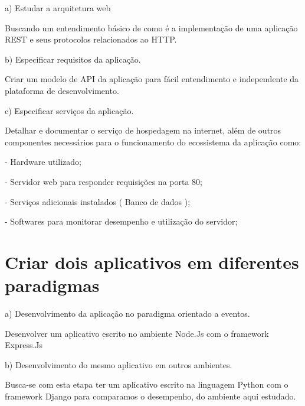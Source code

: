   \begin{compactitem}
    \item[a)] Estudar a arquitetura web
    
    Buscando um entendimento básico de como é a implementação de uma aplicação 
    \ac{REST} e seus protocolos relacionados ao HTTP.
    
    \item[b)] Especificar requisitos da aplicação.
    
    Criar um modelo de \ac{API} da aplicação para fácil entendimento e
    independente da plataforma de desenvolvimento.
    
    \item[c)] Especificar serviços da aplicação.
    
    Detalhar e documentar o serviço de hospedagem na internet, além de outros componentes 
    necessários para o funcionamento do ecossistema da aplicação como:
    
      \begin{compactitem}
	\item[-] Hardware utilizado;
	\item[-] Servidor web para responder requisições na porta 80;
	\item[-] Serviços adicionais instalados ( Banco de dados );
	\item[-] Softwares para monitorar desempenho e utilização do servidor;
      \end{compactitem}
      
  \end{compactitem}

\section{Criar dois aplicativos em diferentes paradigmas}
  
  \begin{compactitem}
    \item[a)] Desenvolvimento da aplicação no paradigma orientado a eventos.
    
    Desenvolver um aplicativo escrito no ambiente Node.Js com o framework Express.Js
    
    \item[b)] Desenvolvimento do mesmo aplicativo em outros ambientes.
    
    Busca-se com esta etapa ter um aplicativo escrito na linguagem Python com o framework Django
    para comparamos o desempenho, do ambiente aqui estudado.
    
  \end{compactitem}

